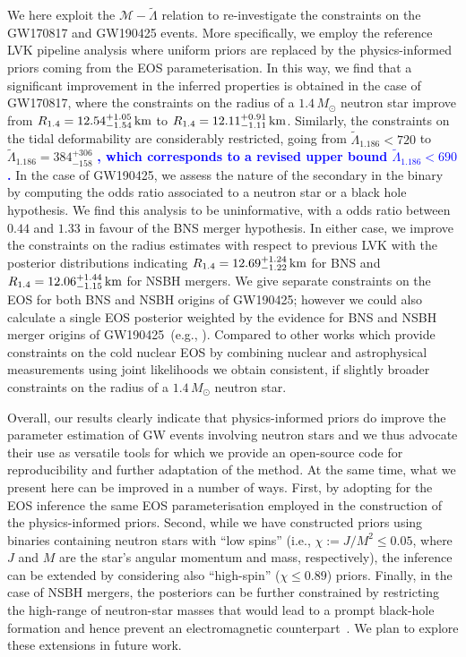 \documentclass[twocolumn,linenumbers]{aastex631}
\newcommand{\blue}[1]{\textcolor{blue}{\textbf{#1}}}
\begin{document}
We here exploit the $\mathcal{M}\!- \!\tilde{\Lambda}$ relation to
re-investigate the constraints on the GW170817 and GW190425 events. More
specifically, we employ the reference LVK pipeline analysis where uniform
priors are replaced by the physics-informed priors coming from the EOS
parameterisation. In this way, we find that a significant improvement in
the inferred properties is obtained in the case of GW170817, where the
constraints on the radius of a $1.4 \, M_\odot$ neutron star improve from
$R_{1.4} = {12.54^{+1.05}_{-1.54}} \, {\rm km}$ to $R_{1.4} =
12.11^{+0.91}_{-1.11} \, {\rm km}$.  Similarly, the constraints on the
tidal deformability are considerably restricted, going from
$\tilde{\Lambda}_{1.186} < 720$ to $\tilde{\Lambda}_{1.186} =
384^{+306}_{-158}$ \blue{, which corresponds to a revised upper bound
  $\tilde{\Lambda}_{1.186}<690$.}  In the case of GW190425, we assess the
nature of the secondary in the binary by computing the odds ratio
associated to a neutron star or a black hole hypothesis.  We find this
analysis to be uninformative, with a odds ratio between $0.44$ and $1.33$
in favour of the BNS merger hypothesis.  In either case, we improve the
constraints on the radius estimates with respect to previous LVK with the
posterior distributions indicating $R_{1.4} = 12.69^{+1.24}_{-1.22} \,
{\rm km}$ for BNS and $R_{1.4} = 12.06^{+1.44}_{-1.15} \, {\rm km}$ for
NSBH mergers. We give separate constraints on the EOS for both BNS and
NSBH origins of GW190425; however we could also calculate a single EOS
posterior weighted by the evidence for BNS and NSBH merger origins of
GW190425~(e.g., \citealt{2020Ashton}). Compared to other works which
provide constraints on the cold nuclear EOS by combining nuclear and
astrophysical measurements using joint likelihoods
\citep[e.g.,][]{2019Coughlin, 2020Dietrich, 2023Tiwari, 2023Pang,
  2024Breschi, 2025Koehn, 2025Golomb} we obtain consistent, if slightly
broader constraints on the radius of a $1.4 \, M_\odot$ neutron star.

Overall, our results clearly indicate that physics-informed priors do
improve the parameter estimation of GW events involving neutron stars and
we thus advocate their use as versatile tools for which we provide an
open-source code for reproducibility and further adaptation of the
method. At the same time, what we present here can be improved in a
number of ways. First, by adopting for the EOS inference the same EOS
parameterisation employed in the construction of the physics-informed
priors. Second, while we have constructed priors using binaries
containing neutron stars with ``low spins'' (i.e., $\chi:=J/M^2 \leq
0.05$, where $J$ and $M$ are the star's angular momentum and mass,
respectively), the inference can be extended by considering also
``high-spin'' ($\chi \leq 0.89$) priors. Finally, in the case of NSBH
mergers, the posteriors can be further constrained by restricting the
high-range of neutron-star masses that would lead to a prompt black-hole
formation and hence prevent an electromagnetic
counterpart~\citep{Bauswein2013, Koeppel2019, Tootle2021,
  Kashyap:2021wzs, Koelsch2021, Ecker:2024kzs}.  We plan to explore these
extensions in future work.
\end{document}
